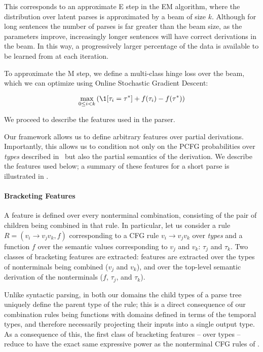 This corresponds to an approximate E step in the EM algorithm, where the
  distribution over latent parses is approximated by a beam of size $k$.
Although for long sentences the number of parses is far greater than the
  beam size, as the parameters improve, increasingly longer sentences will
  have correct derivations in the beam.
In this way, a progressively larger percentage of the data is available to be
	learned from at each iteration.

To approximate the M step, 
  we define a multi-class hinge loss over the beam, which we can optimize
  using Online Stochastic Gradient Descent:

\begin{equation}
\max_{0 \leq i < k} \left(
  \1[\tau_i = \tau^*] + f(\tau_i) - f(\tau^*)
\right)
\end{equation}

We proceed to describe the features used in the parser.


Our framework allows us to define arbitrary features over partial derivations.
Importantly, this allows us to condition not only on the PCFG probabilities
  over \textit{types} described in \me\ but also the partial semantics of the
  derivation.
We describe the features used below; a summary of these features
  for a short parse is illustrated in .

\paragraph{Bracketing Features}
A feature is defined over every nonterminal combination,
  consisting of the pair of children being combined in that rule.
In particular, let us consider a rule
  \mbox{$R = (v_i \rightarrow v_j v_k, f)$} corresponding to a CFG rule
  \mbox{$v_i \rightarrow v_j v_k$} over \textit{types} and a function $f$
  over the semantic values corresponding to 
  $v_j$ and $v_k$: $\tau_j$ and $\tau_k$.
Two classes of bracketing features are extracted:
  features are extracted over the types of nonterminals being combined
    ($v_j$ and $v_k$),
  and over the top-level semantic derivation of the nonterminals
    ($f$, $\tau_j$, and $\tau_k$).

Unlike syntactic parsing, in both our domains the child types of a parse tree
  uniquely define the parent type of the rule; this is a direct consequence
  of our combination rules being functions with domains defined in terms of the
  temporal types, and therefore necessarily projecting
  their inputs into a single output type.
As a consequence of this, the first class of bracketing features -- over
  types -- reduce to have the exact same
  expressive power as the nonterminal CFG rules of \me.

